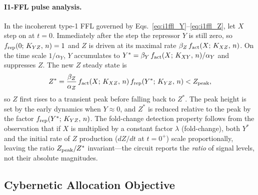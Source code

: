 \label{sec:i1ffl_analysis}

\paragraph{I1-FFL pulse analysis.}
In the incoherent type-1 FFL governed by Eqs.~\eqref{eq:i1ffl_Y}--\eqref{eq:i1ffl_Z},
let $X$ step on at $t = 0$.  Immediately after the step the repressor $Y$
is still zero, so $f_{\rm rep}(0;\,K_{YZ},\,n) = 1$ and $Z$ is driven at
its maximal rate $\beta_Z\,f_{\rm act}(X;\,K_{XZ},\,n)$.  On the time scale
$1/\alpha_Y$, $Y$ accumulates to
$Y^* = \beta_Y\,f_{\rm act}(X;\,K_{XY},\,n)/\alpha_Y$
and suppresses $Z$.  The new $Z$ steady state is
\begin{equation}
  Z^* = \frac{\beta_Z}{\alpha_Z}\,f_{\rm act}(X;\,K_{XZ},\,n)\,
         f_{\rm rep}(Y^*;\,K_{YZ},\,n) < Z_{\rm peak},
\end{equation}
so $Z$ first rises to a transient peak before falling back to $Z^*$.  The
peak height is set by the early dynamics when $Y \approx 0$, and $Z^*$ is
reduced relative to the peak by the factor $f_{\rm rep}(Y^*;\,K_{YZ},\,n)$.
The fold-change detection property \cite{Goentoro2009} follows from the
observation that if $X$ is multiplied by a constant factor $\lambda$
(fold-change), both $Y^*$ and the initial rate of $Z$ production ($dZ/dt$ at $t=0^+$) scale proportionally,
leaving the ratio $Z_{\rm peak}/Z^*$ invariant---the circuit reports the
\emph{ratio} of signal levels, not their absolute magnitudes.

\subsection{Cybernetic Allocation Objective}
\label{sec:cybernetic_derivation}

